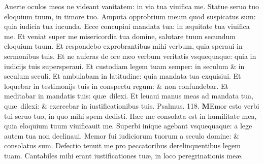 \documentclass[a5paper,10pt]{book}
\def\ae{æ}
\begin{document}
\begin{multicols*}{2}
\newline \color{red} A\color{black}uerte oculos meos ne videant vanitatem: in via tua viuifica me.
\newline \color{red} S\color{black}tatue seruo tuo eloquium tuum, in timore tuo.
\newline \color{red} A\color{black}mputa opprobrium meum quod suspicatus sum: quia iudicia tua iucunda.
\newline \color{red} E\color{black}cce concupiui mandata tua: in \ae quitate tua viuifica me.
\newline \color{red} E\color{black}t veniat super me misericordia tua domine, salutare tuum secundum eloquium tuum.
\newline \color{red} E\color{black}t respondebo exprobrantibus mihi verbum, quia speraui in sermonibus tuis.
\newline \color{red} E\color{black}t ne auferas de ore meo verbum veritatis vsquequaque: quia in iudicijs tuis supersperaui.
\newline \color{red} E\color{black}t custodiam legem tuam semper: in seculum \& in seculum seculi.
\newline \color{red} E\color{black}t ambulabam in latitudine: quia mandata tua exquisiui.
\newline \color{red} E\color{black}t loquebar in testimonijs tuis in conspectu regum: \& non confundebar.
\newline \color{red} E\color{black}t meditabar in mandatis tuis: qu\ae \ dilexi.
\newline \color{red} E\color{black}t leuaui manus meas ad mandata tua, qu\ae \ dilexi: \& exercebar in iustificationibus tuis. \quad \color{red} Psalmus. \hypertarget{ps118.4}{118.} \color{black}
\vspace{-1em}
\lettrine[lines=2]{\bfseries \color{red} M}{}Emor esto verbi tui seruo tuo, in quo mihi spem dedisti.
\newline \color{red} H\color{black}\ae c me consolata est in humilitate mea, quia eloquium tuum viuificauit me.
\newline \color{red} S\color{black}uperbi inique agebant vsquequaque: a lege autem tua non declinaui.
\newline \color{red} M\color{black}emor fui iudiciorum tuorum a seculo domine: \& consolatus sum.
\newline \color{red} D\color{black}efectio tenuit me pro peccatoribus derelinquentibus legem tuam.
\newline \color{red} C\color{black}antabiles mihi erant iustificationes tu\ae , in loco peregrinationis me\ae .

\end{multicols*}
\end{document}
